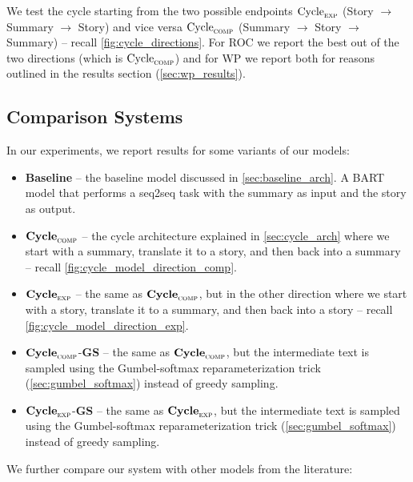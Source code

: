 We test the cycle starting from the two possible endpoints $\text{Cycle}_{\textsc{exp}}$ (Story $\rightarrow$ Summary $\rightarrow$ Story) and vice versa $\text{Cycle}_{\textsc{comp}}$ (Summary $\rightarrow$ Story $\rightarrow$ Summary) -- recall \cref{fig:cycle_directions}. For ROC we report the best out of the two directions (which is $\text{Cycle}_{\textsc{comp}}$) and for WP we report both for reasons outlined in the results section (\cref{sec:wp_results}).

\subsection{Comparison Systems}

In our experiments, we report results for some variants of our models:

\begin{itemize}
\item \textbf{Baseline} -- the baseline model discussed in \cref{sec:baseline_arch}. A BART model that performs a seq2seq task with the summary as input and the story as output.

\item $\textbf{Cycle}_{\textsc{comp}}$ -- the cycle architecture explained in \cref{sec:cycle_arch} where we start with a summary, translate it to a story, and then back into a summary -- recall \cref{fig:cycle_model_direction_comp}.

\item $\textbf{Cycle}_{\textsc{exp}}$ -- the same as $\textbf{Cycle}_{\textsc{comp}}$, but in the other direction where we start with a story, translate it to a summary, and then back into a story  -- recall \cref{fig:cycle_model_direction_exp}.

\item $\textbf{Cycle}_{\textsc{comp}}$-\textbf{GS} -- the same as $\textbf{Cycle}_{\textsc{comp}}$, but the intermediate text is sampled using the Gumbel-softmax reparameterization trick (\cref{sec:gumbel_softmax}) instead of greedy sampling.

\item $\textbf{Cycle}_{\textsc{exp}}$-\textbf{GS} -- the same as $\textbf{Cycle}_{\textsc{exp}}$, but the intermediate text is sampled using the Gumbel-softmax reparameterization trick (\cref{sec:gumbel_softmax}) instead of greedy sampling.
\end{itemize}


We further compare our system with other models from the literature:


